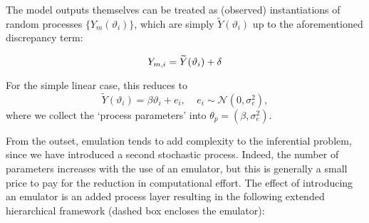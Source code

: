 \documentclass[10pt,a4paper]{article}
\begin{document}
The model outputs themselves can be treated as (observed) instantiations of random processes $\{Y_m(\vartheta_i)\}$, which are simply $\widetilde{Y}(\vartheta_i)$ up to the aforementioned discrepancy term:

\begin{equation}
Y_{m,i} = \widetilde{Y}(\vartheta_i) + \delta \\
\end{equation}

\noindent For the simple linear case, this reduces to
\begin{equation}\label{eq:linear_emulator}
\widetilde{Y}(\vartheta_i) = \beta\vartheta_i + e_i, ~~~~~ e_i \sim \mathcal{N}(0,\sigma^2_e),
\end{equation}
\noindent where we collect the `process parameters' into $\theta_p = (\beta,\sigma^2_e)$.

From the outset, emulation tends to add complexity to the inferential problem, since we have introduced a second stochastic process. Indeed, the number of parameters increases with the use of an emulator, but this is generally a small price to pay for the reduction in computational effort. The effect of introducing an emulator is an added process layer resulting in the following extended hierarchical framework (dashed box encloses the emulator):
\end{document}
